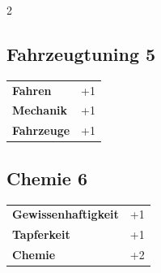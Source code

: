 \begin{multicols}{2}
\begin{tcolorbox}

\end{tcolorbox}

\begin{tcolorbox}
    \subsection*{Fahrzeugtuning \hfill \small{5 }}
    \tcblower




\begin{tabular}{@{}ll@{}}
    \textbf{Fahren} & +1\\
    \textbf{Mechanik} & +1\\
    \textbf{Fahrzeuge} & +1\\
\end{tabular}


\end{tcolorbox}

\begin{tcolorbox}
    \subsection*{Chemie \hfill \small{6 }}
    \tcblower




\begin{tabular}{@{}ll@{}}
    \textbf{Gewissenhaftigkeit} & +1\\
    \textbf{Tapferkeit} & +1\\
    \textbf{Chemie} & +2\\
\end{tabular}



\end{tcolorbox}
\end{multicols}
